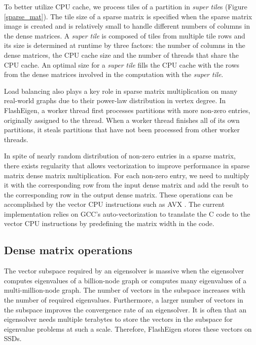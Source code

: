To better utilize CPU cache, we process tiles of a partition in
\textit{super tile}s (Figure \ref{sparse_mat}). The tile size of a sparse
matrix is specified when the sparse matrix image is created and is relatively
small to handle different numbers of columns in the dense matrices.
A \textit{super tile} is composed of tiles from multiple tile rows and its
size is determined at runtime by three factors: the number of columns
in the dense matrices, the CPU cache size and the number of threads that
share the CPU cache. An optimal size for a \textit{super tile} fills
the CPU cache with the rows from the dense matrices involved in
the computation with the \textit{super tile}.

Load balancing also plays a key role in sparse matrix multiplication on
many real-world graphs due to their power-law distribution in vertex degree.
In FlashEigen, a worker thread first processes partitions with more non-zero
entries, originally assigned to the thread. When a worker thread finishes
all of its own partitions, it steals partitions that have not been processed
from other worker threads.

In spite of nearly random distribution of non-zero entries in a sparse matrix,
there exists regularity that allows vectorization to improve performance
in sparse matrix dense matrix multiplication. For each non-zero entry, we
need to multiply it with the corresponding row from the input dense matrix
and add the result to the corresponding row in the output dense matrix.
These operations can be accomplished by the vector CPU instructions such as
AVX \cite{avx}. The current implementation relies on GCC's auto-vectorization
to translate the C code to the vector CPU instructions by predefining the matrix
width in the code.

\subsection{Dense matrix operations}
The vector subspace required by an eigensolver is massive when the eigensolver
computes eigenvalues of a billion-node graph or computes many eigenvalues
of a multi-million-node graph. The number of vectors in the subspace
increases with the number of required eigenvalues. Furthermore, a larger
number of vectors in the subspace improves the convergence rate of an eigensolver. 
It is often that an eigensolver needs multiple terabytes to store the vectors
in the subspace for eigenvalue problems at such a scale. Therefore, FlashEigen
stores these vectors on SSDs.


